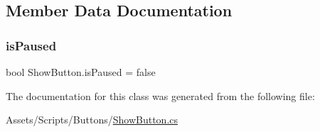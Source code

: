 \subsection{Member Data Documentation}
\mbox{\label{class_show_button_abda8b88daac10df3fe20c640360fcaab}} 
\subsubsection{\texorpdfstring{is\+Paused}{isPaused}}
{\footnotesize\ttfamily bool Show\+Button.\+is\+Paused = false}



The documentation for this class was generated from the following file\+:\begin{DoxyCompactItemize}
\item 
Assets/\+Scripts/\+Buttons/\mbox{\hyperlink{_show_button_8cs}{Show\+Button.\+cs}}\end{DoxyCompactItemize}
